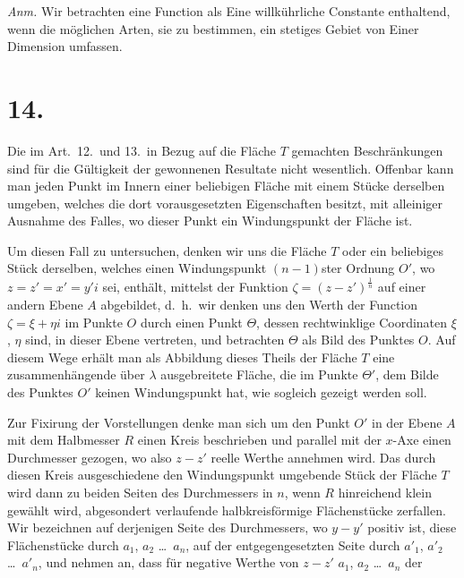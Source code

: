 \documentclass{article}
\begin{document}
\emph{Anm.} Wir betrachten eine Function als Eine willkührliche Constante enthaltend, wenn die möglichen Arten, sie zu bestimmen, ein stetiges Gebiet von Einer Dimension umfassen.

\section*{14.}

Die im Art.~12.\ und 13.\ in Bezug auf die Fläche $T$ gemachten Beschränkungen sind für die Gültigkeit der gewonnenen Resultate nicht wesentlich. Offenbar kann man jeden Punkt im Innern einer beliebigen Fläche mit einem Stücke derselben umgeben, welches die dort vorausgesetzten Eigenschaften besitzt, mit alleiniger Ausnahme des Falles, wo dieser Punkt ein Windungspunkt der Fläche ist.

Um diesen Fall zu untersuchen, denken wir uns die Fläche $T$ oder ein beliebiges Stück derselben, welches einen Windungspunkt $(n-1)$ster Ordnung $O'$, wo $z = z' = x' = y'i$ sei, enthält, mittelst der Funktion $\zeta = (z - z')^{\frac{1}{n}}$ auf einer andern Ebene $A$ abgebildet, d.\ h.\ wir denken uns den Werth der Function $\zeta = \xi + \eta i$ im Punkte $O$ durch einen Punkt $\varTheta$, dessen rechtwinklige Coordinaten $\xi$, $\eta$ sind, in dieser Ebene vertreten, und betrachten $\varTheta$ als Bild des Punktes $O$. Auf diesem Wege erhält man als Abbildung dieses Theils der Fläche $T$ eine zusammenhängende über $\lambda$ ausgebreitete Fläche, die im Punkte $\varTheta'$, dem Bilde des Punktes $O'$ keinen Windungspunkt hat, wie sogleich gezeigt werden soll.

Zur Fixirung der Vorstellungen denke man sich um den Punkt $O'$ in der Ebene $A$ mit dem Halbmesser $R$ einen Kreis beschrieben und parallel mit der $x$-Axe einen Durchmesser gezogen, wo also $z - z'$ reelle Werthe annehmen wird. Das durch diesen Kreis ausgeschiedene den Windungspunkt umgebende Stück der Fläche $T$ wird dann zu beiden Seiten des Durchmessers in $n$, wenn $R$ hinreichend klein gewählt wird, abgesondert verlaufende halbkreisförmige Flächenstücke zerfallen. Wir bezeichnen auf derjenigen Seite des Durchmessers, wo $y - y'$ positiv ist, diese Flächenstücke durch $a_1$, $a_2$ \dots\ $a_n$, auf der entgegengesetzten Seite durch $a'_1$, $a'_2$ \dots\ $a'_n$, und nehmen an, dass für negative Werthe von $z - z'$ $a_1$, $a_2$ \dots\ $a_n$ der
\end{document}

